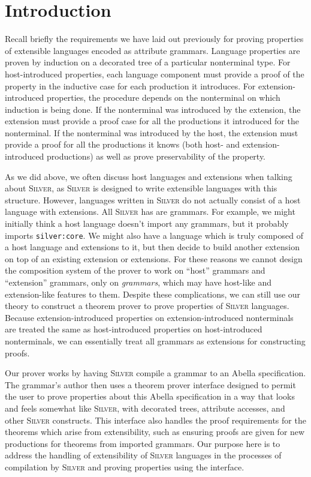 \documentclass[11pt]{article}
\newcommand{\grammar}[1]{\texttt{#1}}
\newcommand{\silver}{\textsc{Silver}}
\begin{document}
\section{Introduction}

Recall briefly the requirements we have laid out previously for
proving properties of extensible languages encoded as attribute
grammars.  Language properties are proven by induction on a decorated
tree of a particular nonterminal type.  For host-introduced
properties, each language component must provide a proof of the
property in the inductive case for each production it introduces.  For
extension-introduced properties, the procedure depends on the
nonterminal on which induction is being done.  If the nonterminal was
introduced by the extension, the extension must provide a proof case
for all the productions it introduced for the nonterminal.  If the
nonterminal was introduced by the host, the extension must provide a
proof for all the productions it knows (both host- and
extension-introduced productions) as well as prove preservability of
the property.


As we did above, we often discuss host languages and extensions when
talking about \silver{}, as \silver{} is designed to write extensible
languages with this structure.  However, languages written in
\silver{} do not actually consist of a host language with extensions.
All \silver{} has are grammars.
%
For example, we might initially think a host language doesn't import
any grammars, but it probably imports \grammar{silver:core}.
%
We might also have a language which is truly composed of a host
language and extensions to it, but then decide to build another
extension on top of an existing extension or extensions.
%
For these reasons we cannot design the composition system of the
prover to work on ``host'' grammars and ``extension'' grammars, only
on \emph{grammars}, which may have host-like and extension-like
features to them.
%
Despite these complications, we can still use our theory to construct
a theorem prover to prove properties of \silver{} languages.  Because
extension-introduced properties on extension-introduced nonterminals
are treated the same as host-introduced properties on host-introduced
nonterminals, we can essentially treat all grammars as extensions for
constructing proofs.


Our prover works by having \silver{} compile a grammar to an Abella
specification.  The grammar's author then uses a theorem prover
interface designed to permit the user to prove properties about this
Abella specification in a way that looks and feels somewhat like
\silver, with decorated trees, attribute accesses, and other \silver{}
constructs.  This interface also handles the proof requirements for
the theorems which arise from extensibility, such as ensuring proofs
are given for new productions for theorems from imported grammars.
%
Our purpose here is to address the handling of extensibility of
\silver{} languages in the processes of compilation by \silver{} and
proving properties using the interface.
\end{document}
